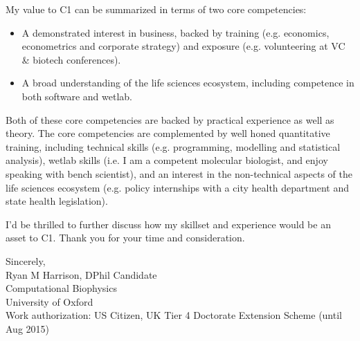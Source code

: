 \documentclass{../res}
\begin{document}
\begin{sloppypar}
\begin{resume}
My value to C1 can be summarized in terms of two core competencies: 
\begin{itemize}
    \item A demonstrated interest in business, backed by training (e.g. economics, econometrics and corporate strategy) and exposure (e.g. volunteering at VC \& biotech conferences).
    \item A broad understanding of the life sciences ecosystem, including competence in both software and wetlab.
\end{itemize}
Both of these core competencies are backed by practical experience as well as theory. The core competencies are complemented by well honed quantitative training, including technical skills (e.g. programming, modelling and statistical analysis), wetlab skills (i.e. I am a competent molecular biologist, and enjoy speaking with bench scientist), and an interest in the non-technical aspects of the life sciences ecosystem (e.g. policy internships with a city health department and state health legislation).

I'd be thrilled to further discuss how my skillset and experience would be an asset to C1. Thank you for your time and consideration.

Sincerely, \\
Ryan M Harrison, DPhil Candidate \\
Computational Biophysics \\
University of Oxford  \\
Work authorization: US Citizen, UK Tier 4 Doctorate Extension Scheme (until Aug 2015)
\end{resume} 
\end{sloppypar}
\end{document}
